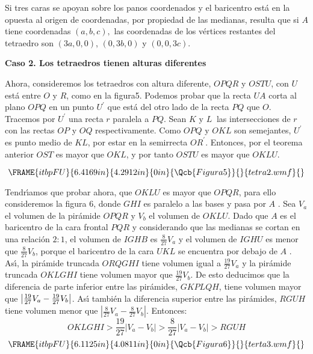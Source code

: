 \documentclass[a4paper,spanish]{article}
\begin{document}
Si tres caras se apoyan sobre los panos coordenados y el baricentro est\'{a}
en la opuesta al origen de coordenadas, por propiedad de las medianas,
resulta que si $A$ tiene coordenadas $\left( a,b,c\right) ,$ las coordenadas
de los v\'{e}rtices restantes del tetraedro son $\left( 3a,0,0\right) $, $%
\left( 0,3b,0\right) $ y $\left( 0,0,3c\right) $.

\textbf{Caso 2. Los tetraedros tienen alturas diferentes}

Ahora, consideremos los tetraedros con altura diferente, $OPQR$ y $OSTU$,
con $U$ est\'{a} entre $O$ y $R$, como en la figura5. Podemos probar que la
recta $UA$ corta al plano $OPQ$ en un punto $U^{\prime }$ que est\'{a} del
otro lado de la recta $PQ$ que $O$. Tracemos por $U^{\prime }$ una recta $r$
paralela a $PQ$. Sean $K$ y $L\ $ las intersecciones de $r$ con las rectas $%
OP$ y $OQ$ respectivamente. Como $OPQ$ y $OKL$ son semejantes, $U^{\prime }$
es punto medio de $KL$, por estar en la semirrecta $OR^{\prime }$. Entonces,
por el teorema anterior $OST$ es mayor que $OKL$, y por tanto $OSTU$ es
mayor que $OKLU$.

\[
\FRAME{itbpFU}{6.4169in}{4.2912in}{0in}{\Qcb{Figura 5}}{}{tetra2.wmf}{%
\special{language "Scientific Word";type "GRAPHIC";maintain-aspect-ratio
TRUE;display "USEDEF";valid_file "F";width 6.4169in;height 4.2912in;depth
0in;original-width 6.3538in;original-height 4.2393in;cropleft "0";croptop
"1";cropright "1";cropbottom "0";filename
'F:/Optimizacion/tetra2.wmf';file-properties "XNPEUR";}} 
\]

Tendr\'{\i}amos que probar ahora, que $OKLU$ es mayor que $OPQR$, para ello
consideremos la figura 6, donde $GHI$ es paralelo a las bases y pasa por $A$%
. Sea $V_{a}$ el volumen de la pir\'{a}mide $OPQR$ y $V_{b}$ el volumen de $%
OKLU$. Dado que $A$ es el baricentro de la cara frontal $PQR$ y considerando
que las medianas se cortan en una relaci\'{o}n $2:1$, el volumen de $IGHB$
es $\frac{8}{27}V_{a}$ y el volumen de $IGHU$ es menor que $\frac{8}{27}%
V_{b} $, porque el baricentro de la cara $UKL$ se encuentra por debajo de $A$%
. As\'{\i}, la pir\'{a}mide truncada $ORQGHI$ tiene volumen igual a $\frac{19%
}{27}V_{a}$ y la pir\'{a}mide truncada $OKLGHI$ tiene volumen mayor que $%
\frac{19}{27}V_{b}$. De esto deducimos que la diferencia de parte inferior
entre las pir\'{a}mides, $GKPLQH$, tiene volumen mayor que $\left\vert \frac{%
19}{27}V_{a}-\frac{19}{27}V_{b}\right\vert $. As\'{\i} tambi\'{e}n la
diferencia superior entre las pir\'{a}mides, $RGUH$ tiene volumen menor que $%
\left\vert \frac{8}{27}V_{a}-\frac{8}{27}V_{b}\right\vert $. Entonces: 
\[
OKLGHI>\frac{19}{27}\left\vert V_{a}-V_{b}\right\vert >\frac{8}{27}%
\left\vert V_{a}-V_{b}\right\vert >RGUH 
\]%
\[
\FRAME{itbpFU}{6.1125in}{4.0811in}{0in}{\Qcb{Figura 6}}{}{terta3.wmf}{%
\special{language "Scientific Word";type "GRAPHIC";maintain-aspect-ratio
TRUE;display "USEDEF";valid_file "F";width 6.1125in;height 4.0811in;depth
0in;original-width 6.052in;original-height 4.0309in;cropleft "0";croptop
"1";cropright "1";cropbottom "0";filename
'F:/Optimizacion/terta3.wmf';file-properties "XNPEUR";}} 
\]
\end{document}

